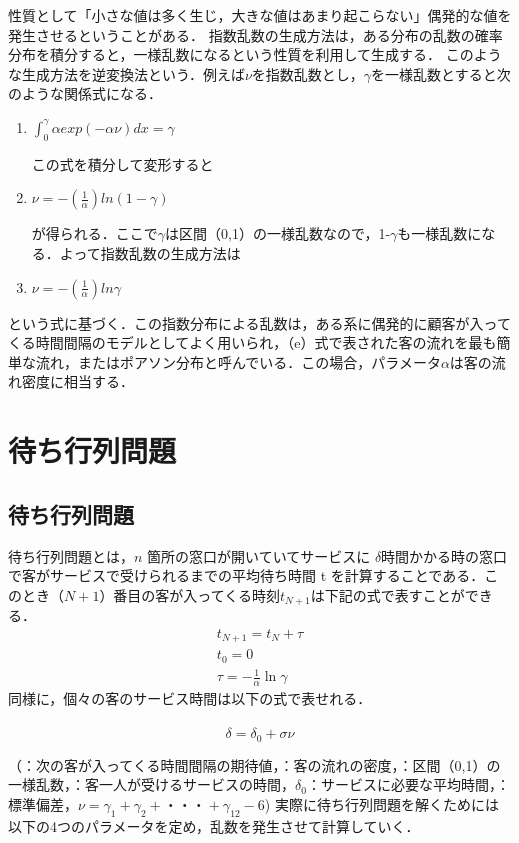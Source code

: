 \documentclass[12pt,a4j]{ltjsarticle}
\begin{document}
性質として「小さな値は多く生じ，大きな値はあまり起こらない」偶発的な値を発生させるということがある．
指数乱数の生成方法は，ある分布の乱数の確率分布を積分すると，一様乱数になるという性質を利用して生成する．
このような生成方法を逆変換法という．例えば$\nu$を指数乱数とし，$\gamma$を一様乱数とすると次のような関係式になる．
\begin{enumerate}[label=(\roman*)]
\item $\int_0^\gamma{\alpha}exp(-\alpha\nu)dx = \gamma$

\noindent
この式を積分して変形すると

\item $\nu = -(\frac{1}{\alpha})ln(1-\gamma)$

\noindent
が得られる．ここで$\gamma$は区間（0,1）の一様乱数なので，1-$\gamma$も一様乱数になる．よって指数乱数の生成方法は

\item $\nu = -(\frac{1}{\alpha})ln\gamma$
\end{enumerate} 
\noindent
という式に基づく．この指数分布による乱数は，ある系に偶発的に顧客が入ってくる時間間隔のモデルとしてよく用いられ，（e）式で表された客の流れを最も簡単な流れ，またはポアソン分布と呼んでいる．この場合，パラメータ$\alpha$は客の流れ密度に相当する．

\clearpage

\section{ 待ち行列問題}
\subsection{待ち行列問題}
待ち行列問題とは，$n$ 箇所の窓口が開いていてサービスに $\delta$時間かかる時の窓口で客がサービスで受けられるまでの平均待ち時間 t を計算することである．このとき（$N+1$）番目の客が入ってくる時刻$t_{N+1}$は下記の式で表すことができる．\\

\begin{eqnarray}
t_{N+1}=t_N+\tau\\
t_0=0\\　
\tau=-\frac{1}{\alpha}\ln\gamma
\end{eqnarray}
同様に，個々の客のサービス時間は以下の式で表せれる．\\　
\begin{equation}
\delta=\delta_0+\sigma\nu
\end{equation}

（\tau：次の客が入ってくる時間間隔の期待値，\alpha：客の流れの密度，\gamma：区間（0,1）の一様乱数，\delta：客一人が受けるサービスの時間，$\delta_0$：サービスに必要な平均時間，\sigma：標準偏差，$\nu=\gamma_1+\gamma_2+・・・+\gamma_{12}-6$)
実際に待ち行列問題を解くためには以下の4つのパラメータを定め，乱数を発生させて計算していく．
\end{document}
